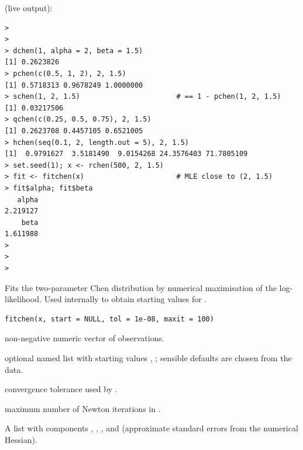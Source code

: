 \documentclass[11pt,a4paper]{article}
\begin{document}
\vspace{0.8em}
 (live output):
\begin{lstlisting}
> 
> 
> dchen(1, alpha = 2, beta = 1.5)
[1] 0.2623826
> pchen(c(0.5, 1, 2), 2, 1.5)
[1] 0.5718313 0.9678249 1.0000000
> schen(1, 2, 1.5)                       # == 1 - pchen(1, 2, 1.5)
[1] 0.03217506
> qchen(c(0.25, 0.5, 0.75), 2, 1.5)
[1] 0.2623708 0.4457105 0.6521005
> hchen(seq(0.1, 2, length.out = 5), 2, 1.5)
[1]  0.9791627  3.5181490  9.0154268 24.3576403 71.7805109
> set.seed(1); x <- rchen(500, 2, 1.5)
> fit <- fitchen(x)                      # MLE close to (2, 1.5)
> fit$alpha; fit$beta
   alpha 
2.219127 
    beta 
1.611988 
> 
> 
> 
\end{lstlisting}


\newpage

%
\begin{Description}
Fits the two-parameter Chen distribution by numerical
maximisation of the log-likelihood. Used internally to obtain
starting values for .
\end{Description}
%
\begin{Usage}
\begin{verbatim}
fitchen(x, start = NULL, tol = 1e-08, maxit = 100)
\end{verbatim}
\end{Usage}
%
\begin{Arguments}
\begin{ldescription}
\item[\code{x}] non-negative numeric vector of observations.

\item[\code{start}] optional named list with starting values ,
; sensible defaults are chosen from the data.

\item[\code{tol}] convergence tolerance used by .

\item[\code{maxit}] maximum number of Newton iterations in .
\end{ldescription}
\end{Arguments}
%
\begin{Value}
A list with components , ,
,  and  (approximate
standard errors from the numerical Hessian).
\end{Value}
%
\end{document}
